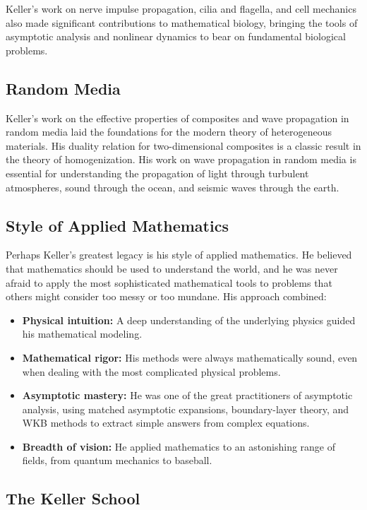Keller's work on nerve impulse propagation, cilia and flagella, and cell mechanics also made significant contributions to mathematical biology, bringing the tools of asymptotic analysis and nonlinear dynamics to bear on fundamental biological problems.

\subsection{Random Media}

Keller's work on the effective properties of composites and wave propagation in random media laid the foundations for the modern theory of heterogeneous materials. His duality relation for two-dimensional composites is a classic result in the theory of homogenization. His work on wave propagation in random media is essential for understanding the propagation of light through turbulent atmospheres, sound through the ocean, and seismic waves through the earth.

\subsection{Style of Applied Mathematics}

Perhaps Keller's greatest legacy is his style of applied mathematics. He believed that mathematics should be used to understand the world, and he was never afraid to apply the most sophisticated mathematical tools to problems that others might consider too messy or too mundane. His approach combined:

\begin{itemize}
  \item \textbf{Physical intuition:} A deep understanding of the underlying physics guided his mathematical modeling.
  \item \textbf{Mathematical rigor:} His methods were always mathematically sound, even when dealing with the most complicated physical problems.
  \item \textbf{Asymptotic mastery:} He was one of the great practitioners of asymptotic analysis, using matched asymptotic expansions, boundary-layer theory, and WKB methods to extract simple answers from complex equations.
  \item \textbf{Breadth of vision:} He applied mathematics to an astonishing range of fields, from quantum mechanics to baseball.
\end{itemize}

\subsection{The Keller School}

